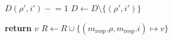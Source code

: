 \begin{algorithm}[!tb]
\begin{algorithmic}[1]
            \State $D(\rho',i')\mathrel{-}=1$
              \State $D\gets D\setminus\{(\rho',i')\}$
            \EndIf
          \EndFor
  
            \State \textbf{return} $v$
          \Else
            \State $\mathit{R}
              \gets\mathit{R}\cup
              \{(m_{\mathrm{resp}}.\rho,m_{\mathrm{resp}}.i)
              \mapsto v\}$
          \EndIf
        \EndWhile
      \EndProcedure
    \end{algorithmic}
  \end{algorithm}



